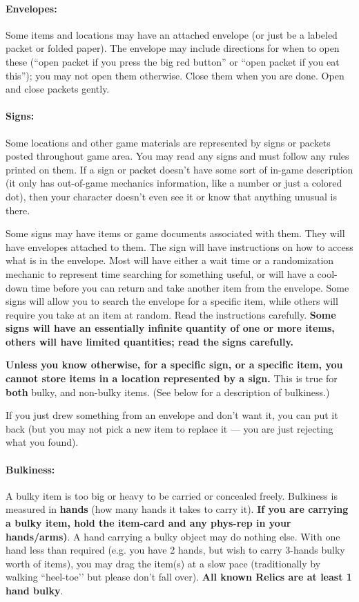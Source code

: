 \documentclass[sheet]{GL2020}
\begin{document}
\paragraph{Envelopes:} Some items and locations may have an attached envelope (or just be a labeled packet or folded paper). The envelope may include directions for when to open these (``open packet if you press the big red button'' or ``open packet if you eat this''); you may not open them otherwise. Close them when you are done. Open and close packets gently.

\paragraph{Signs:} Some locations and other game materials are represented by signs or packets posted throughout game area. You may read any signs and must follow any rules printed on them. If a sign or packet doesn't have some sort of in-game description (it only has out-of-game mechanics information, like a number or just a colored dot), then your character doesn't even see it or know that anything unusual is there.

Some signs may have items or game documents associated with them. They will have envelopes attached to them. The sign will have instructions on how to access what is in the envelope. Most will have either a wait time or a randomization mechanic to represent time searching for something useful, or will have a cool-down time before you can return and take another item from the envelope. Some signs will allow you to search the envelope for a specific item, while others will require you take at an item at random. Read the instructions carefully. \textbf{Some signs will have an essentially infinite quantity of one or more items, others will have limited quantities; read the signs carefully.}

\textbf{Unless you know otherwise, for a specific sign, or a specific item, you cannot store items in a location represented by a sign.} This is true for \textbf{both} bulky, and non-bulky items. (See below for a description of bulkiness.)

If you just drew something from an envelope and don't want it, you can put it back (but you may not pick a new item to replace it — you are just rejecting what you found).

\paragraph{Bulkiness:} A bulky item is too big or heavy to be carried or concealed freely. Bulkiness is measured in {\bf hands} (how many hands it takes to carry it). \textbf{If you are carrying a bulky item, hold the item-card and any phys-rep in your hands/arms)}. A hand carrying a bulky object may do nothing else. With one hand less than required (e.g. you have 2 hands, but wish to carry 3-hands bulky worth of items), you may drag the item(s) at a slow pace (traditionally by walking ``heel-toe'’ but please don’t fall over). \textbf{All known Relics are at least 1 hand bulky}.
\end{document}
